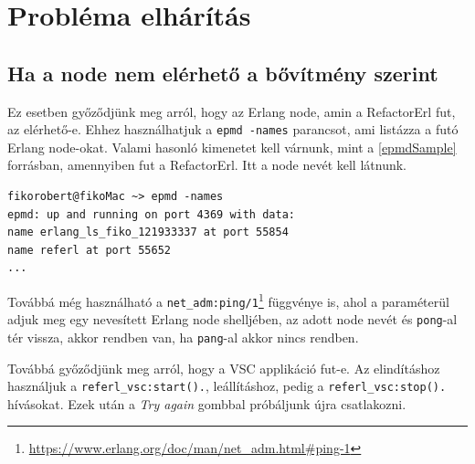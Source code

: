 \section{Probléma elhárítás}
\subsection{Ha a node nem elérhető a bővítmény szerint} \label{not_reachable_node}

Ez esetben győződjünk meg arról, hogy az Erlang node, amin a RefactorErl fut, az elérhető-e. Ehhez használhatjuk a \lstinline{epmd -names} parancsot, ami listázza a futó Erlang node-okat.
Valami hasonló kimenetet kell várnunk, mint a \ref{epmdSample} forrásban, amennyiben fut a RefactorErl. Itt a node nevét kell látnunk.

\lstset{caption=Erlang Port Mapper Deamon (epmd) példa kimenete, label=src:shell}  \label{epmdSample}
\begin{lstlisting}[language={shell}] 
fikorobert@fikoMac ~> epmd -names
epmd: up and running on port 4369 with data:
name erlang_ls_fiko_121933337 at port 55854
name referl at port 55652
...
\end{lstlisting}


Továbbá még használható a \lstinline{net_adm:ping/1}\footnote{\url{https://www.erlang.org/doc/man/net_adm.html#ping-1}} függvénye is, ahol a paraméterül adjuk meg egy nevesített Erlang node shelljében, az adott node nevét és \lstinline{pong}-al tér vissza, akkor rendben van, ha \lstinline{pang}-al akkor nincs rendben.

Továbbá győződjünk meg arról, hogy a VSC applikáció fut-e. Az elindításhoz használjuk a \lstinline{referl_vsc:start().}, leállításhoz, pedig a \lstinline{referl_vsc:stop().} hívásokat. Ezek után a \textit{Try again} gombbal próbáljunk újra csatlakozni.
